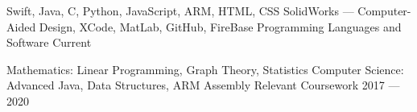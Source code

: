 \vspace{-5pt}

\begin{cvhonors}

    \cventry
    {Swift, Java, C, Python, JavaScript, ARM, HTML, CSS \newline
    SolidWorks — Computer-Aided Design, XCode, MatLab, GitHub, FireBase} %
    {Programming Languages and Software} %
    {} %
    {Current} %
    {}
    
    \vspace{-5pt}
    
   \cventry
    {Mathematics: Linear Programming, Graph Theory, Statistics \newline
    Computer Science:  Advanced Java, Data Structures, ARM Assembly} %
    {Relevant Coursework} %
    {} %
    {2017 — 2020} %
    {}
    

\end{cvhonors}
